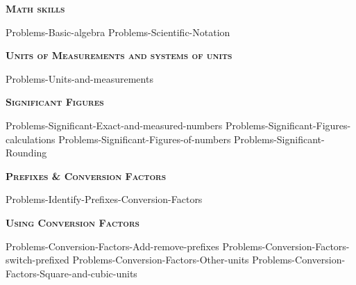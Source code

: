 \documentclass[main.tex]{subfiles}
\newcommand\chapterlabel{Ch-measurements}
\begin{document}
\newpage
\setdoublesep{0.35700 em}  %
\setatomsep{1.78500 em}    %
\setbondoffset{0.18265 em} %
\renewcommand{\bondwidth}{0.06642 em} %
\setbondstyle{line width = \bondwidth}
\fancyhfoffset[E,O]{0pt}
\setlength{\columnsep}{30pt}
\begin{conclusion}
\end{conclusion}
\begin{multicols*}{2}\setcounter{numA}{1}
 
 


{\raggedright\textsc{\textbf{Math skills }}\par}
{Problems-Basic-algebra}
{Problems-Scientific-Notation}

{\raggedright\textsc{\textbf{Units of Measurements and systems of units }}\par}
{Problems-Units-and-measurements}

{\raggedright\textsc{\textbf{Significant Figures }}\par}
{Problems-Significant-Exact-and-measured-numbers}
{Problems-Significant-Figures-calculations}
{Problems-Significant-Figures-of-numbers}
{Problems-Significant-Rounding}



{\raggedright\textsc{\textbf{Prefixes \& Conversion Factors }}\par}
{Problems-Identify-Prefixes-Conversion-Factors}




{\raggedright\textsc{\textbf{Using Conversion Factors }}\par}
{Problems-Conversion-Factors-Add-remove-prefixes}
{Problems-Conversion-Factors-switch-prefixed}
{Problems-Conversion-Factors-Other-units}
{Problems-Conversion-Factors-Square-and-cubic-units}



\end{multicols*}
\end{document}
